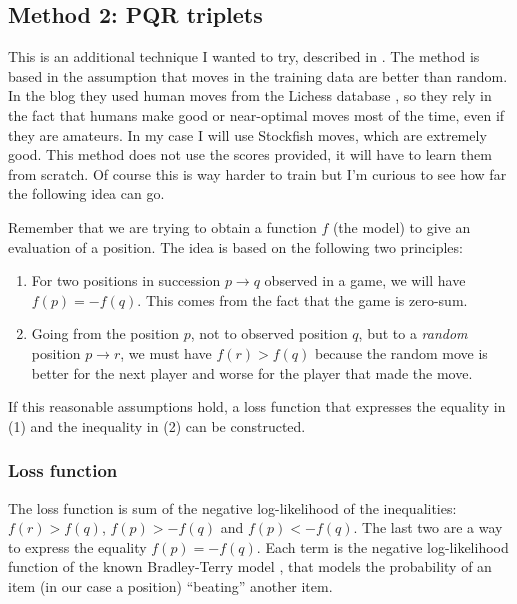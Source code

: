 \subsection{Method 2: PQR triplets}

This is an additional technique I wanted to try, described in \cite{dlchess:2014}. The method is based in the assumption that moves in the training data are better than random. In the blog they used human moves from the Lichess database \cite{lichessdb}, so they rely in the fact that humans make good or near-optimal moves most of the time, even if they are amateurs. In my case I will use Stockfish moves, which are extremely good. This method does not use the scores provided, it will have to learn them from scratch. Of course this is way harder to train but I'm curious to see how far the following idea can go.

Remember that we are trying to obtain a function $f$ (the model) to give an evaluation of a position. The idea is based on the following two principles:

\begin{enumerate}
\item For two positions in succession $p \rightarrow q$ observed in a game, we will have $f(p)=-f(q)$. This comes from the fact that the game is zero-sum.
\item Going from the position $p$, not to observed position $q$, but to a \textit{random} position $p \rightarrow r$, we must have $f(r) > f(q)$ because the random move is better for the next player and worse for the player that made the move.
\end{enumerate}

If this reasonable assumptions hold, a loss function that expresses the equality in (1) and the inequality in (2) can be constructed.


\subsubsection{Loss function}

The loss function is sum of the negative log-likelihood of the inequalities: ${f(r) > f(q)}$, ${f(p) > - f(q)}$ and ${f(p) < -f(q)}$. The last two are a way to express the equality $f(p)=-f(q)$. Each term is the negative log-likelihood function of the known Bradley-Terry model \cite{bradley-terry:1952}, that models the probability of an item (in our case a position) \enquote{beating} another item.

